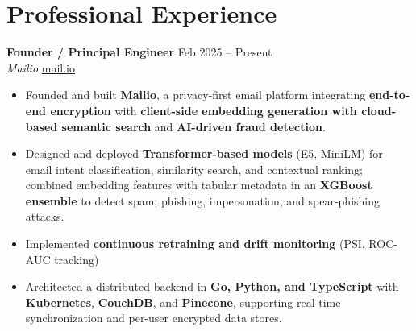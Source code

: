 \documentclass[11pt]{article}
\begin{document}
\section*{Professional Experience}
\textbf{Founder / Principal Engineer} \hfill Feb 2025 -- Present \\
\textit{Mailio} \hfill \href{https://mail.io}{mail.io}
\begin{itemize}
    \item Founded and built \textbf{Mailio}, a privacy-first email platform integrating \textbf{end-to-end encryption} with \textbf{client-side embedding generation with cloud-based semantic search} and \textbf{AI-driven fraud detection}.
    \item Designed and deployed \textbf{Transformer-based models} (E5, MiniLM) for email intent classification, similarity search, and contextual ranking; combined embedding features with tabular metadata in an \textbf{XGBoost ensemble} to detect spam, phishing, impersonation, and spear-phishing attacks.
    \item Implemented \textbf{continuous retraining and drift monitoring} (PSI, ROC-AUC tracking)
    \item Architected a distributed backend in \textbf{Go, Python, and TypeScript} with \textbf{Kubernetes}, \textbf{CouchDB}, and \textbf{Pinecone}, supporting real-time synchronization and per-user encrypted data stores.
\end{itemize}
\end{document}
